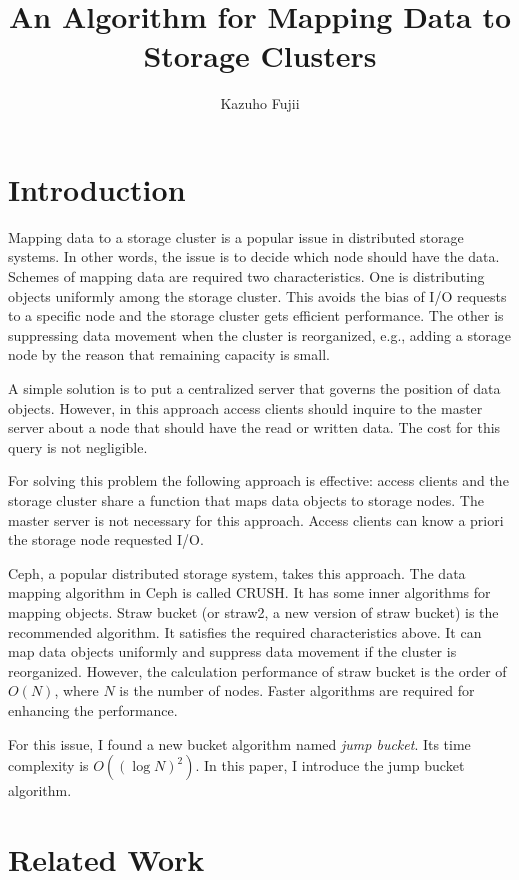 \documentclass[a4paper,11pt]{article}
\title{An Algorithm for Mapping Data to Storage Clusters}
\author{Kazuho Fujii}
\date{}
\begin{document}
\maketitle

\section{Introduction}

Mapping data to a storage cluster is a popular issue in distributed storage systems.
In other words, the issue is to decide which node should have the data.
Schemes of mapping data are required two characteristics.
One is distributing objects uniformly among the storage cluster.
This avoids the bias of I/O requests to a specific node and the storage cluster gets efficient performance.
The other is suppressing data movement when the cluster is reorganized, e.g., adding a storage node by the reason that remaining capacity is small.

A simple solution is to put a centralized server that governs the position of data objects.
However, in this approach access clients should inquire to the master server about a node
that should have the read or written data.
The cost for this query is not negligible.

For solving this problem the following approach is effective:
access clients and the storage cluster share a function that maps data objects to storage nodes.
The master server is not necessary for this approach.
Access clients can know a priori the storage node requested I/O.

Ceph\cite{ceph}, a popular distributed storage system, takes this approach.
The data mapping algorithm in Ceph is called CRUSH\cite{crush}.
It has some inner algorithms for mapping objects.
Straw bucket (or straw2, a new version of straw bucket) is the recommended algorithm.
It satisfies the required characteristics above.
It can map data objects uniformly and suppress data movement if the cluster is reorganized.
However, the calculation performance of straw bucket is the order of $O(N)$, where $N$ is the number of nodes.
Faster algorithms are required for enhancing the performance.

For this issue, I found a new bucket algorithm named {\it jump bucket}.
Its time complexity is $O((\log N)^2)$.
In this paper, I introduce the jump bucket algorithm.

\section{Related Work}
\end{document}
